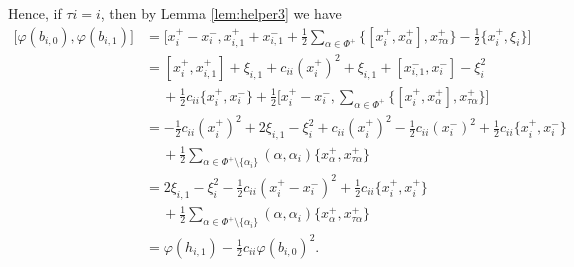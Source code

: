 \documentclass[11pt,reqno]{amsart}
\numberwithin{equation}{section}
\theoremstyle{definition}
\theoremstyle{remark}
\newcommand{\hf}{\tfrac12}
\begin{document}
Hence, if $\tau i=i$, then by Lemma \ref{lem:helper3} we have
\begin{align*}
\big[\varphi(b_{i,0}),\varphi(b_{i,1})\big]&=\Big[x_i^+-x_i^-,x_{i,1}^++x_{i,1}^-+\hf\sum_{\alpha\in \Phi^+}\big\{[x_i^+,x_\alpha^+],x_{\tau\alpha}^+\big\}-\hf\big\{x_i^+,\xi_i\big\}\Big]\\
&=[x_i^+,x_{i,1}^+]+\xi_{i,1}+c_{ii}(x_i^+)^2+\xi_{i,1}+[x_{i,1}^-,x_i^-]-\xi_i^2 \\
&\quad~ +\hf c_{ii}\{x_i^+,x_i^-\}+\hf\big[x_i^+ -x_i^-,\sum_{\alpha\in\Phi^+}\big\{[x_i^+,x_{\alpha}^+],x_{\tau \alpha}^+\big\}\big]\\
&=-\hf c_{ii}(x_i^+)^2+2\xi_{i,1}-\xi_i^2+c_{ii}(x_i^+)^2-\hf c_{ii}(x_i^-)^2+\hf c_{ii}\{x_i^+,x_i^-\}\\
&\quad~ +\hf \sum_{\alpha\in\Phi^+\setminus\{\alpha_i\}}(\alpha,\alpha_i)\big\{x_{\alpha}^+,x_{\tau\alpha}^+\big\}\\
&=2\xi_{i,1}-\xi_i^2-\hf c_{ii}(x_i^+-x_i^-)^2+\hf c_{ii}\{x_{i}^+,x_{i}^+\}\\
&\quad~ +\hf \sum_{\alpha\in\Phi^+\setminus\{\alpha_i\}}(\alpha,\alpha_i)\big\{x_{\alpha}^+,x_{\tau\alpha}^+\big\}\\
&= \varphi(h_{i,1})-\hf c_{ii}\varphi(b_{i,0})^2.
\end{align*}
\end{document}
